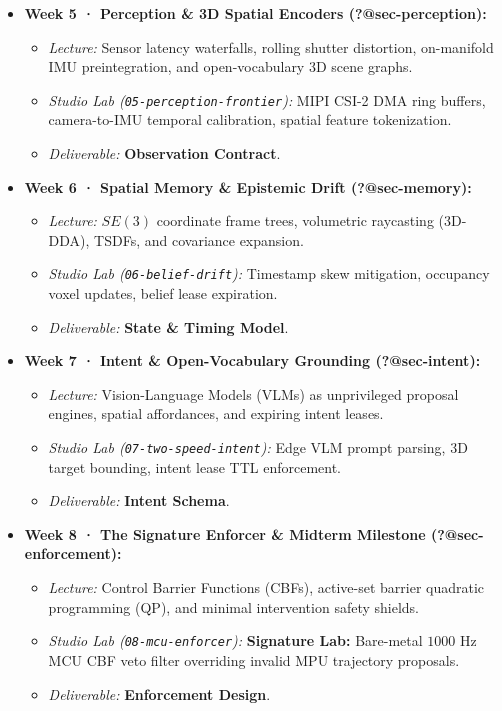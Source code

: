 \documentclass[
  9pt,
  letterpaper,
  open=right,
  numbers=noenddot,
  captions=tableheading]{scrbook}
\providecommand{\tightlist}{%
  \setlength{\itemsep}{0pt}\setlength{\parskip}{0pt}}
\def\tightlist{}
\let\tightlist\relax
\begin{document}
\begin{itemize}
\tightlist
\item
  \textbf{Week 5 · Perception \& 3D Spatial Encoders
  (\textbf{?@sec-perception}):}

  \begin{itemize}
  \tightlist
  \item
    \emph{Lecture:} Sensor latency waterfalls, rolling shutter
    distortion, on-manifold IMU preintegration, and open-vocabulary 3D
    scene graphs.
  \item
    \emph{Studio Lab (\texttt{05-perception-frontier}):} MIPI CSI-2 DMA
    ring buffers, camera-to-IMU temporal calibration, spatial feature
    tokenization.
  \item
    \emph{Deliverable:} \textbf{Observation Contract}.
  \end{itemize}
\item
  \textbf{Week 6 · Spatial Memory \& Epistemic Drift
  (\textbf{?@sec-memory}):}

  \begin{itemize}
  \tightlist
  \item
    \emph{Lecture:} \(SE(3)\) coordinate frame trees, volumetric
    raycasting (3D-DDA), TSDFs, and covariance expansion.
  \item
    \emph{Studio Lab (\texttt{06-belief-drift}):} Timestamp skew
    mitigation, occupancy voxel updates, belief lease expiration.
  \item
    \emph{Deliverable:} \textbf{State \& Timing Model}.
  \end{itemize}
\item
  \textbf{Week 7 · Intent \& Open-Vocabulary Grounding
  (\textbf{?@sec-intent}):}

  \begin{itemize}
  \tightlist
  \item
    \emph{Lecture:} Vision-Language Models (VLMs) as unprivileged
    proposal engines, spatial affordances, and expiring intent leases.
  \item
    \emph{Studio Lab (\texttt{07-two-speed-intent}):} Edge VLM prompt
    parsing, 3D target bounding, intent lease TTL enforcement.
  \item
    \emph{Deliverable:} \textbf{Intent Schema}.
  \end{itemize}
\item
  \textbf{Week 8 · The Signature Enforcer \& Midterm Milestone
  (\textbf{?@sec-enforcement}):}

  \begin{itemize}
  \tightlist
  \item
    \emph{Lecture:} Control Barrier Functions (CBFs), active-set barrier
    quadratic programming (QP), and minimal intervention safety shields.
  \item
    \emph{Studio Lab (\texttt{08-mcu-enforcer}):} \textbf{Signature
    Lab:} Bare-metal \(1000\text{ Hz}\) MCU CBF veto filter overriding
    invalid MPU trajectory proposals.
  \item
    \emph{Deliverable:} \textbf{Enforcement Design}.
  \end{itemize}
\end{itemize}
\end{document}
